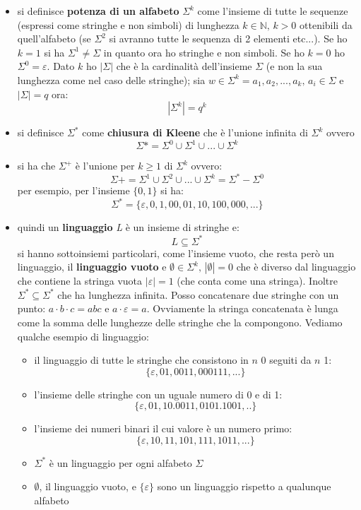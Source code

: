 \begin{itemize}
	\item si definisce \textbf{potenza di un alfabeto} $\Sigma^k$ come l'insieme di tutte le sequenze (espressi come stringhe e non simboli) di lunghezza $k\in\mathbb{N},\, k>0$ ottenibili da quell'alfabeto (se $\Sigma^2$ si avranno tutte le sequenza di 2 elementi etc...). Se ho $k=1$ si ha $\Sigma^1\neq \Sigma$ in quanto ora ho stringhe e non simboli. Se ho $k=0$ ho $\Sigma^0=\varepsilon$. Dato $k$ ho $|\Sigma|$ che è la cardinalità dell'insieme $\Sigma$ (e non la sua lunghezza come nel caso delle stringhe); sia $w\in\Sigma^k=a_1,a_2,...,a_k,\,a_i\in\Sigma$ e $|\Sigma|=q$ ora: $$|\Sigma^k|=q^k$$
	\item si definisce $\Sigma^*$ come\textbf{ chiusura di Kleene} che è l'unione infinita di $\Sigma^k$ ovvero $$\Sigma*=\Sigma^0\cup \Sigma^1\cup...\cup \Sigma^k$$
	\item si ha che $\Sigma^+$ è l'unione per $k\geq 1$ di $\Sigma^k$ ovvero:
				$$\Sigma+=\Sigma^1\cup \Sigma^2\cup...\cup \Sigma^k= \Sigma^*-\Sigma^0$$
				per esempio, per l'insieme $\{0,1\}$ si ha:
				$$\Sigma^*=\{\varepsilon,0,1,00,01,10,100,000,...\}$$
	\item quindi un \textbf{linguaggio} \textit{L} è un insieme di stringhe e:
				$$L\subseteq \Sigma^*$$
				si hanno sottoinsiemi particolari, come l'insieme vuoto, che resta però un linguaggio, il \textbf{linguaggio vuoto} e $\emptyset\in\Sigma^k,\,|\emptyset|=0$ che è diverso dal linguaggio che contiene la stringa vuota $|\varepsilon|=1$ (che conta come una stringa). Inoltre $\Sigma^*\subseteq \Sigma^*$ che ha lunghezza infinita. Posso concatenare due stringhe con un punto: $a\cdot b\cdot c=abc$ e $a\cdot \varepsilon=a$. Ovviamente la stringa concatenata è lunga come la somma delle lunghezze delle stringhe che la compongono. Vediamo qualche esempio di linguaggio:
				\begin{itemize}
					\item il linguaggio di tutte le stringhe che consistono in $n$ 0 seguiti da $n$ 1:
								$$\{\varepsilon,01,0011,000111,...\}$$
					\item l'insieme delle stringhe con un uguale numero di 0 e di 1:
								$$\{\varepsilon,01,10.0011,0101.1001,..\}$$
					\item l'insieme dei numeri binari il cui valore è un numero primo:
								$$\{\varepsilon,10 , 11, 101, 111,1011,...\}$$
					\item $\Sigma^*$ è un linguaggio per ogni alfabeto $\Sigma$
					\item $\emptyset$, il linguaggio vuoto, e $\{\varepsilon\}$ sono un linguaggio rispetto a qualunque alfabeto
				\end{itemize}
\end{itemize}
